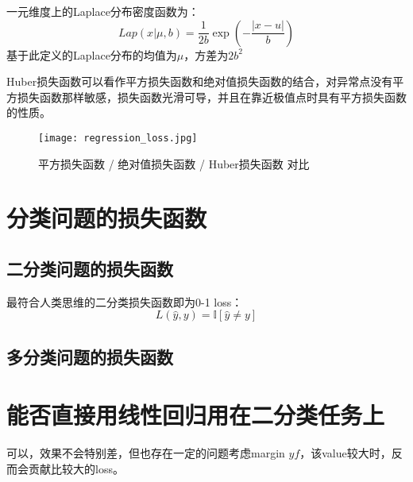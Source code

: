 \begin{definition}[Laplace分布] \label{def:laplace} 
  一元维度上的Laplace分布密度函数为：
  \begin{equation}
    Lap(x|\mu, b) = \frac{1}{2b}\exp\left(-\frac{|x-u|}{b}\right)
  \end{equation}
  基于此定义的Laplace分布的均值为$\mu$，方差为$2b^2$
\end{definition}

Huber损失函数可以看作平方损失函数和绝对值损失函数的结合，对异常点没有平方损失函数那样敏感，损失函数光滑可导，并且在靠近极值点时具有平方损失函数的性质。

\begin{figure}[htbp]
  \centering
  \texttt{[image: regression\_loss.jpg]}
  \caption{平方损失函数 / 绝对值损失函数 / Huber损失函数 对比 \label{fig:regression_loss}}
\end{figure}


\section{分类问题的损失函数}

\subsection{二分类问题的损失函数}

最符合人类思维的二分类损失函数即为0-1 loss：
\begin{equation}
  L(\hat{y}, y) = \mathbb{I}[\hat{y} \neq y]
\end{equation}

\subsection{多分类问题的损失函数}

\section{能否直接用线性回归用在二分类任务上}

可以，效果不会特别差，但也存在一定的问题考虑margin $yf$，该value较大时，反而会贡献比较大的loss。